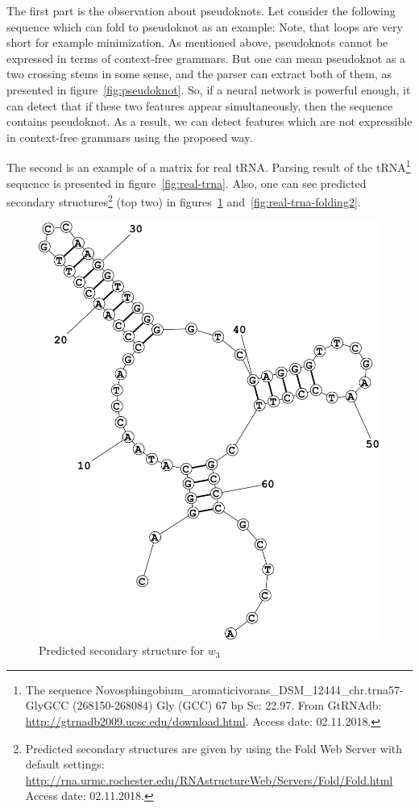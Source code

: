 \documentclass[a4paper,twoside]{article}
\begin{document}
The first part is the observation about pseudoknots. 
Let consider the following sequence which can fold to pseudoknot as an example: {}
Note, that loops are very short for example minimization.
As mentioned above, pseudoknots cannot be expressed in terms of context-free grammars. 
But one can mean pseudoknot as a two crossing stems in some sense, and the parser can extract both of them, as presented in figure~\ref{fig:pseudoknot}.
So, if a neural network is powerful enough, it can detect that if these two features appear simultaneously, then the sequence contains pseudoknot.
As a result, we can detect features which are not expressible in context-free grammars using the proposed way.

The second is an example of a matrix for real tRNA.
Parsing result of the tRNA\footnote{The sequence Novosphingobium\_aromaticivorans\_DSM\_12444\_chr.trna57-GlyGCC (268150-268084)  Gly (GCC) 67 bp Sc: 22.97. From GtRNAdb: \url{http://gtrnadb2009.ucsc.edu/download.html}. Access date: 02.11.2018.} sequence {} is presented in figure~\ref{fig:real-trna}. Also, one can see predicted secondary structures\footnote{Predicted secondary structures are given by using the Fold Web Server with default settings: \url{http://rna.urmc.rochester.edu/RNAstructureWeb/Servers/Fold/Fold.html} Access date: 02.11.2018.} (top two) in figures~\ref{fig:real-trna-folding1} and~\ref{fig:real-trna-folding2}.

\begin{figure}
\centering
\includegraphics[width=.45\textwidth]{figures/Fold1.pdf}
\caption{Predicted secondary structure for $w_3$}
\label{fig:real-trna-folding1}
\end{figure}
\end{document}
